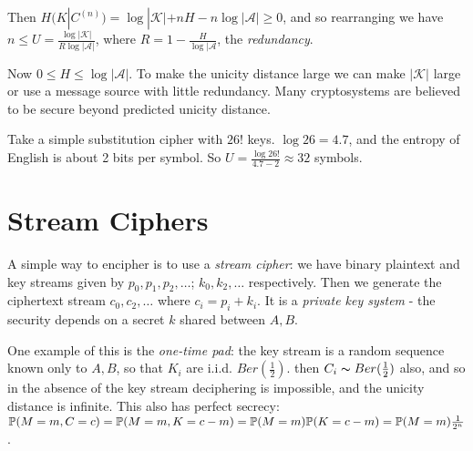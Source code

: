 \documentclass[10pt,a4paper]{article}
\begin{document}
Then $H(K|C^{(n)}) = \log |\mathcal{K}| + nH - n\log|\mathscr{A}| \geq 0$, and so rearranging we have $n \leq U = \frac{\log |\mathcal{K}|}{R\log |\mathscr{A}|}$, where $R = 1-\frac{H}{\log |\mathscr{A}}$, the \emph{redundancy}.

Now $0 \leq H \leq \log|\mathscr{A}|$. To make the unicity distance large we can make $|\mathcal{K}|$ large or use a message source with little redundancy. Many cryptosystems are believed to be secure beyond predicted unicity distance. 

\example Take a simple substitution cipher with $26!$ keys. $\log 26 = 4.7$, and the entropy of English is about 2 bits per symbol. So $U = \frac{\log 26!}{4.7-2} \approx 32$ symbols.

\section{Stream Ciphers}
A simple way to encipher is to use a \emph{stream cipher}: we have binary plaintext and key streams given by $p_0, p_1, p_2, \ldots$; $k_0, k_2, \ldots$ respectively. Then we generate the ciphertext stream $c_0, c_2, \ldots$ where $c_i = p_i+k_i$. It is a \emph{private key system} - the security depends on a secret $k$ shared between $A, B$.

One example of this is the \emph{one-time pad}: the key stream is a random sequence known only to $A,B$, so that $K_i$ are i.i.d. $Ber(\frac12)$. then $C_i \thicksim Ber(\frac12)$ also, and so in the absence of the key stream deciphering is impossible, and the unicity distance is infinite. This also has perfect secrecy: $\P(M=m, C=c) = \P(M=m, K=c-m) = \P(M=m)\P(K=c-m) =\P(M=m)\frac{1}{2^n}$.
\end{document}
